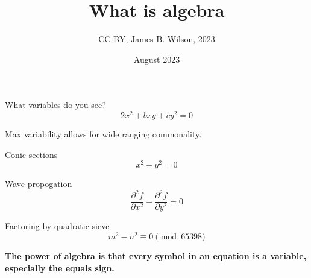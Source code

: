 \documentclass{beamer}
\title{What is algebra}
\subtitle{}
\author{CC-BY, James B. Wilson, 2023}
\institute{Department of Mathematics\\ Colorado State University}
\date{August 2023}
\begin{document}
\begin{frame}
    \maketitle
\end{frame}

\begin{frame}

    \begin{tbee}{What variables do you see?}
        \[
        2x^2+bxy+cy^2 = 0
        \]
    \end{tbee}
\end{frame}

\begin{frame}
    Max variability allows for wide ranging commonality.
    \begin{tbee}{Conic sections}
        \[
            x^2-y^2  =0
        \] 
    \end{tbee}

    \begin{tbee}{Wave propogation}
        \[
        \frac{\partial^2 f}{\partial x^2}-\frac{\partial^2 f}{\partial y^2} = 0
        \] 
    \end{tbee}

    \begin{tbee}{Factoring by quadratic sieve}
        \[
        m^2-n^2  \equiv 0 \pmod{65398}
        \]
    \end{tbee}
    
    
\end{frame}
\begin{frame}
    \begin{tbee}
        \textbf{The power of algebra is that every symbol 
        in an equation is a variable, especially the equals sign.}
    \end{tbee}
\end{frame}
\end{document}
